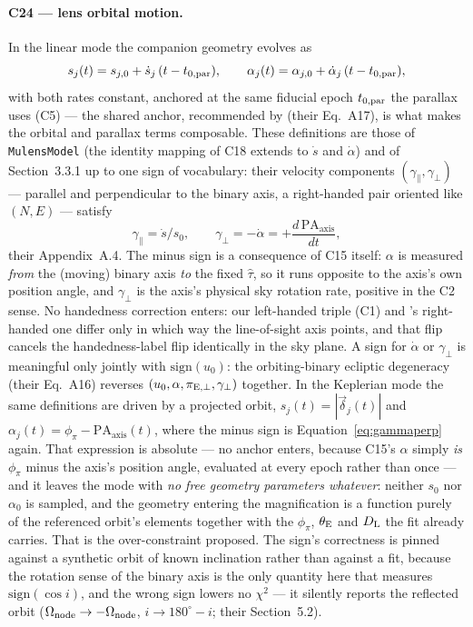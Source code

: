 \paragraph{C24 --- lens orbital motion.}  In the linear mode the companion
geometry evolves as
\begin{equation}
s_j(t) = s_{j,0} + \dot{s}_j\,(t - t_{0,\rm par}), \qquad
\alpha_j(t) = \alpha_{j,0} + \dot{\alpha}_j\,(t - t_{0,\rm par}),
\end{equation}
with both rates constant, anchored at the same fiducial epoch
$t_{0,\rm par}$ the parallax uses (C5) --- the shared anchor, recommended by
\citet{Skowron:2011} (their Eq.~A17), is what makes the orbital and parallax
terms composable.  These definitions are those of \texttt{MulensModel} (the
identity mapping of C18 extends to $\dot{s}$ and $\dot{\alpha}$) and of
\citet{Skowron:2011} Section~3.3.1 up to one sign of vocabulary: their
velocity components $(\gamma_\parallel, \gamma_\perp)$ --- parallel and
perpendicular to the binary axis, a right-handed pair oriented like
$(N, E)$ --- satisfy
\begin{equation}
\gamma_\parallel = \dot{s}/s_0, \qquad
\gamma_\perp = -\dot{\alpha} = +\frac{d\,\mathrm{PA_{axis}}}{dt},
\label{eq:gammaperp}
\end{equation}
their Appendix~A.4.  The minus sign is a consequence of C15 itself: $\alpha$
is measured \emph{from} the (moving) binary axis \emph{to} the fixed
$\hat{\tau}$, so it runs opposite to the axis's own position angle, and
$\gamma_\perp$ is the axis's physical sky rotation rate, positive in the C2
sense.  No handedness correction enters: our left-handed triple (C1) and
\citet{Skowron:2011}'s right-handed one differ only in which way the
line-of-sight axis points, and that flip cancels the handedness-label flip
identically in the sky plane.  A sign for $\dot{\alpha}$ or $\gamma_\perp$
is meaningful only jointly with $\mathrm{sign}(u_0)$: the orbiting-binary
ecliptic degeneracy (their Eq.~A16) reverses
$(u_0, \alpha, \pi_{\rm E,\perp}, \gamma_\perp)$ together.  In the Keplerian
mode the same definitions are driven by a projected orbit,
$s_j(t) = |\vec{\delta}_j(t)|$ and $\alpha_j(t) = \phi_\pi -
\mathrm{PA_{axis}}(t)$, where the minus sign is
Equation~\ref{eq:gammaperp} again.  That expression is absolute --- no
anchor enters, because C15's $\alpha$ simply \emph{is} $\phi_\pi$ minus
the axis's position angle, evaluated at every epoch rather than once ---
and it leaves the mode with \emph{no free geometry parameters whatever}:
neither $s_0$ nor $\alpha_0$ is sampled, and the geometry entering the
magnification is a function purely of the referenced orbit's elements
together with the $\phi_\pi$, $\theta_{\rm E}$ and $D_{\rm L}$ the fit
already carries.  That is the over-constraint \citet{Skowron:2011}
proposed.  The sign's correctness is pinned
against a synthetic orbit of known inclination rather than against a fit,
because the rotation sense of the binary axis is the only quantity here
that measures $\mathrm{sign}(\cos i)$, and the wrong sign lowers no
$\chi^2$ --- it silently reports the reflected orbit
($\Omega_{\rm node} \rightarrow -\Omega_{\rm node}$,
$i \rightarrow 180^\circ - i$; their Section~5.2).


